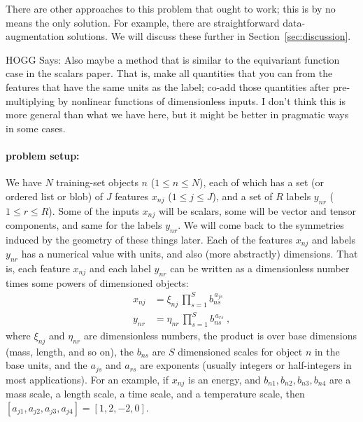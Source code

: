 \documentclass[12pt, letterpaper]{article}
\newcommand{\sectionname}{Section}
\newcommand{\secref}[1]{\sectionname~\ref{#1}}
\begin{document}
There are other approaches to this problem that ought to work; this is by no means the only solution.
For example, there are straightforward data-augmentation solutions.
We will discuss these further in \secref{sec:discussion}.

HOGG Says: Also maybe a method that is similar to the equivariant function case in the scalars paper.
That is, make all quantities that you can from the features that have the same units as the label; co-add those quantities after pre-multiplying by nonlinear functions of dimensionless inputs.
I don't think this is more general than what we have here, but it might be better in pragmatic ways in some cases.

\paragraph{problem setup:} 
We have $N$ training-set objects $n$ ($1\leq n\leq N$), each of which has a set (or ordered list or blob) of $J$ features $x_{nj}$ ($1\leq j\leq J$), and a set of $R$ labels $y_{nr}$ ($1\leq r\leq R$).
Some of the inputs $x_{nj}$ will be scalars, some will be vector and tensor components, and same for the labels $y_{nr}$.
We will come back to the symmetries induced by the geometry of these things later.
Each of the features $x_{nj}$ and labels $y_{nr}$ has a numerical value with units, and also (more abstractly) dimensions.
That is, each feature $x_{nj}$ and each label $y_{nr}$ can be written as a dimensionless number times some powers of dimensioned objects:
\begin{align}\label{eq:xnj}
    x_{nj} &= \xi_{nj} \,\prod_{s=1}^S b_{ns}^{\,a_{js}} \\
    y_{nr} &= \eta_{nr}\,\prod_{s=1}^S b_{ns}^{\,a_{rs}} ~,
\end{align}
where $\xi_{nj}$ and $\eta_{nr}$ are dimensionless numbers, the product is over base dimensions (mass, length, and so on), the $b_{ns}$ are $S$ dimensioned scales for object $n$ in the base units, and the $a_{js}$ and $a_{rs}$ are exponents (usually integers or half-integers in most applications).
For an example, if $x_{nj}$ is an energy, and $b_{n1}, b_{n2}, b_{n3}, b_{n4}$ are a mass scale, a length scale, a time scale, and a temperature scale, then $[a_{j1}, a_{j2}, a_{j3}, a_{j4}] = [1, 2, -2, 0]$.
\end{document}
